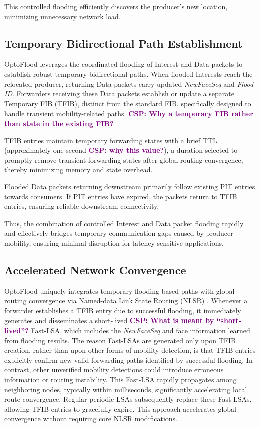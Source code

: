 \documentclass[conference]{IEEEtran}
\newcommand{\csp}[1]{\textbf{\textcolor{purple}{CSP: #1}}}
\begin{document}
This controlled flooding efficiently discovers the producer's new location, minimizing unnecessary network load.

\subsection{Temporary Bidirectional Path Establishment}
\label{sec:solution:bidir}

OptoFlood leverages the coordinated flooding of Interest and Data packets to establish robust temporary bidirectional paths. When flooded Interests reach the relocated producer, returning Data packets carry updated \textit{NewFaceSeq} and \textit{Flood-ID}. Forwarders receiving these Data packets establish or update a separate Temporary FIB (TFIB), distinct from the standard FIB, specifically designed to handle transient mobility-related paths.
\csp{Why a temporary FIB rather than state in the existing FIB?}

TFIB entries maintain temporary forwarding states with a brief TTL (approximately one second \csp{why this value?}), a duration selected to promptly remove transient forwarding states after global routing convergence, thereby minimizing memory and state overhead.

Flooded Data packets returning downstream primarily follow existing PIT entries towards consumers. If PIT entries have expired, the packets return to TFIB entries, ensuring reliable downstream connectivity.

Thus, the combination of controlled Interest and Data packet flooding rapidly and effectively bridges temporary communication gaps caused by producer mobility, ensuring minimal disruption for latency-sensitive applications.


\subsection{Accelerated Network Convergence}
\label{sec:solution:convergence}

OptoFlood uniquely integrates temporary flooding-based paths with global routing convergence via Named-data Link State Routing (NLSR) \cite{}. Whenever a forwarder establishes a TFIB entry due to successful flooding, it immediately generates and disseminates a short-lived \csp{What is meant by ``short-lived''?} Fast-LSA, which includes the \textit{NewFaceSeq} and face information learned from flooding results. The reason Fast-LSAs are generated only upon TFIB creation, rather than upon other forms of mobility detection, is that TFIB entries explicitly confirm new valid forwarding paths identified by successful flooding. In contrast, other unverified mobility detections could introduce erroneous information or routing instability. This Fast-LSA rapidly propagates among neighboring nodes, typically within milliseconds, significantly accelerating local route convergence. Regular periodic LSAs subsequently replace these Fast-LSAs, allowing TFIB entries to gracefully expire. This approach accelerates global convergence without requiring core NLSR modifications.
\end{document}
